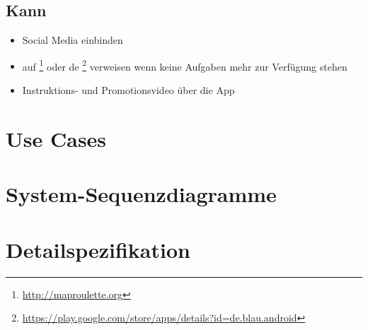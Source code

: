\subsection{Kann}
\begin{itemize}
	\item Social Media einbinden
	\item auf \footnote{\url{http://maproulette.org}} oder de \footnote{\url{https://play.google.com/store/apps/details?id=de.blau.android}} verweisen wenn keine Aufgaben mehr zur Verfügung stehen
	\item Instruktions- und Promotionsvideo über die App
\end{itemize}


\section{Use Cases}


\section{System-Sequenzdiagramme}


\section{Detailspezifikation}

